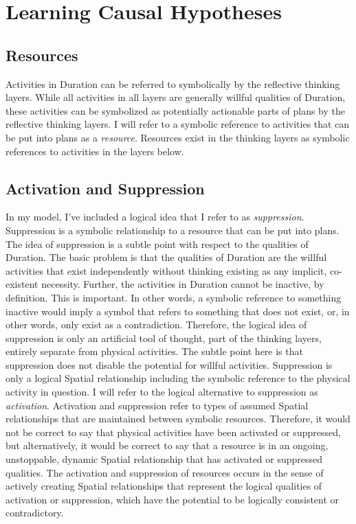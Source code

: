 \chapter{Learning Causal Hypotheses}
\label{chapter:learning_causal_hypotheses}

\section{Resources}

Activities in Duration can be referred to symbolically by the
reflective thinking layers.  While all activities in all layers are
generally willful qualities of Duration, these activities can be
symbolized as potentially actionable parts of plans by the reflective
thinking layers.  I will refer to a symbolic reference to activities
that can be put into plans as a \emph{resource}.  Resources exist in
the thinking layers as symbolic references to activities in the layers
below.

\section{Activation and Suppression}

In my model, I've included a logical idea that I refer to as
\emph{suppression}.  Suppression is a symbolic relationship to a
resource that can be put into plans.  The idea of suppression is a
subtle point with respect to the qualities of Duration.  The basic
problem is that the qualities of Duration are the willful activities
that exist independently without thinking existing as any implicit,
co-existent necessity.  Further, the activities in Duration cannot be
inactive, by definition.  This is important.  In other words, a
symbolic reference to something inactive would imply a symbol that
refers to something that does not exist, or, in other words, only
exist as a contradiction.  Therefore, the logical idea of suppression
is only an artificial tool of thought, part of the thinking layers,
entirely separate from physical activities.  The subtle point here is
that suppression does not disable the potential for willful
activities.  Suppression is only a logical Spatial relationship
including the symbolic reference to the physical activity in question.
I will refer to the logical alternative to suppression as
\emph{activation}.  Activation and suppression refer to types of
assumed Spatial relationships that are maintained between symbolic
resources.  Therefore, it would not be correct to say that physical
activities have been activated or suppressed, but alternatively, it
would be correct to say that a resource is in an ongoing, unstoppable,
dynamic Spatial relationship that has activated or suppressed
qualities.  The activation and suppression of resources occurs in the
sense of actively creating Spatial relationships that represent the
logical qualities of activation or suppression, which have the
potential to be logically consistent or contradictory.

